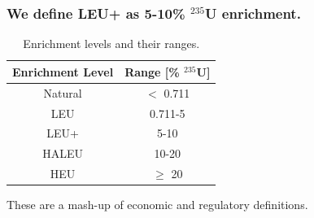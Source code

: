 \documentclass[9pt]{beamer}
\begin{document}
  \begin{frame}
    \frametitle{We define LEU+ as 5-10\% $^{235}$U enrichment.}
    \begin{table}[H]
        \centering
        \caption{Enrichment levels and their ranges.}
        \label{tab:enrichment_levels}
        \begin{tabular}{c c}
          \hline
          \textbf{Enrichment Level} & \textbf{Range [\%  $^{235}$U]} \\
          \hline
          Natural & $<$ 0.711 \\
          LEU & 0.711-5 \\
          LEU+ & 5-10 \\
          HALEU & 10-20 \\
          HEU & $\geq$ 20  \\
          \hline
        \end{tabular}
    \end{table}
    These are a mash-up of economic and regulatory definitions.
  \end{frame}
\end{document}

